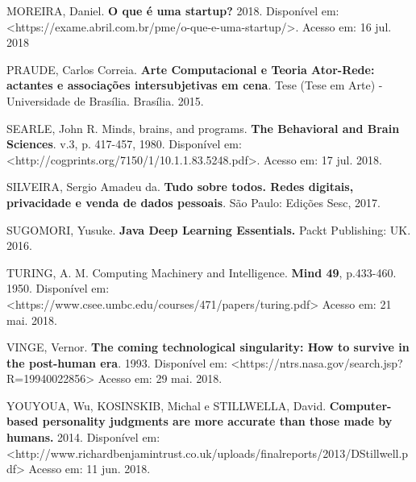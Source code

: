 MOREIRA, Daniel. \textbf{O que é uma startup?} 2018. Disponível em:
\textless{}https://exame.abril.com.br/pme/o-que-e-uma-startup/\textgreater{}.
Acesso em: 16 jul. 2018

PRAUDE, Carlos Correia. \textbf{Arte Computacional e Teoria Ator-Rede:
actantes e associações intersubjetivas em cena}. Tese (Tese em Arte) -
Universidade de Brasília. Brasília. 2015.

SEARLE, John R. Minds, brains, and programs. \textbf{The Behavioral and
Brain Sciences}. v.3, p. 417-457, 1980. Disponível em:
\textless{}http://cogprints.org/7150/1/10.1.1.83.5248.pdf\textgreater{}.
Acesso em: 17 jul. 2018.

SILVEIRA, Sergio Amadeu da. \textbf{Tudo sobre todos. Redes digitais,
privacidade e venda de dados pessoais}. São Paulo: Edições Sesc, 2017.

SUGOMORI, Yusuke. \textbf{Java Deep Learning Essentials.} Packt
Publishing: UK. 2016.

TURING, A. M. Computing Machinery and Intelligence. \textbf{Mind 49},
p.433-460. 1950. Disponível em:
\textless{}https://www.csee.umbc.edu/courses/471/papers/turing.pdf\textgreater{}
Acesso em: 21 mai. 2018.

VINGE, Vernor. \textbf{The coming technological singularity: How to
survive in the post-human era}. 1993. Disponível em:
\textless{}https://ntrs.nasa.gov/search.jsp?R=19940022856\textgreater{}
Acesso em: 29 mai. 2018.

YOUYOUA, Wu, KOSINSKIB, Michal e STILLWELLA, David.
\textbf{Computer-based personality judgments are more accurate than
those made by humans.} 2014. Disponível em:
\textless{}http://www.richardbenjamintrust.co.uk/uploads/finalreports/2013/DStillwell.pdf\textgreater{}
Acesso em: 11 jun. 2018.
